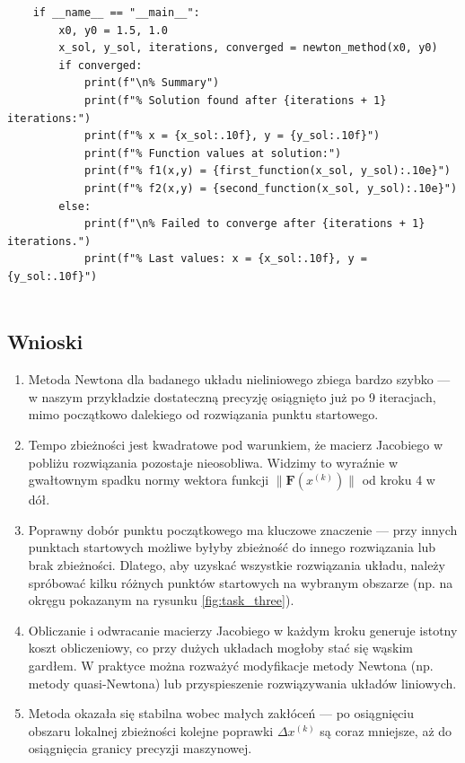 \documentclass[a4paper,12pt]{article}
\begin{document}
\begin{lstlisting}
    if __name__ == "__main__":
        x0, y0 = 1.5, 1.0
        x_sol, y_sol, iterations, converged = newton_method(x0, y0)
        if converged:
            print(f"\n% Summary")
            print(f"% Solution found after {iterations + 1} iterations:")
            print(f"% x = {x_sol:.10f}, y = {y_sol:.10f}")
            print(f"% Function values at solution:")
            print(f"% f1(x,y) = {first_function(x_sol, y_sol):.10e}")
            print(f"% f2(x,y) = {second_function(x_sol, y_sol):.10e}")
        else:
            print(f"\n% Failed to converge after {iterations + 1} iterations.")
            print(f"% Last values: x = {x_sol:.10f}, y = {y_sol:.10f}")
    
    \end{lstlisting}
    
    
    \subsection*{Wnioski}
    
    \begin{enumerate}
      \item Metoda Newtona dla badanego układu nieliniowego zbiega bardzo szybko — w naszym przykładzie dostateczną precyzję osiągnięto już po 9 iteracjach, mimo początkowo dalekiego od rozwiązania punktu startowego.
      \item Tempo zbieżności jest kwadratowe pod warunkiem, że macierz Jacobiego w pobliżu rozwiązania pozostaje nieosobliwa. Widzimy to wyraźnie w gwałtownym spadku normy wektora funkcji \(\|\mathbf F(x^{(k)})\|\) od kroku 4 w dół.
      \item Poprawny dobór punktu początkowego ma kluczowe znaczenie — przy innych punktach startowych możliwe byłyby zbieżność do innego rozwiązania lub brak zbieżności. Dlatego, aby uzyskać wszystkie rozwiązania układu, należy spróbować kilku różnych punktów startowych na wybranym obszarze (np. na okręgu pokazanym na rysunku \ref{fig:task_three}).
      \item Obliczanie i odwracanie macierzy Jacobiego w każdym kroku generuje istotny koszt obliczeniowy, co przy dużych układach mogłoby stać się wąskim gardłem. W praktyce można rozważyć modyfikacje metody Newtona (np. metody quasi-Newtona) lub przyspieszenie rozwiązywania układów liniowych.
      \item Metoda okazała się stabilna wobec małych zakłóceń — po osiągnięciu obszaru lokalnej zbieżności kolejne poprawki \(\Delta x^{(k)}\) są coraz mniejsze, aż do osiągnięcia granicy precyzji maszynowej.
    \end{enumerate}
    
    
    
    
    
    
\end{document}
